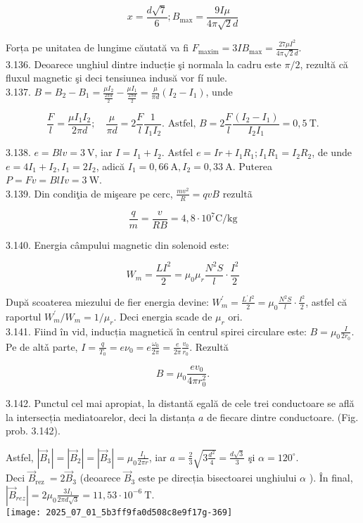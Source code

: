 $$
x=\frac{d \sqrt{7}}{6} ; B_{\max }=\frac{9 I \mu}{4 \pi \sqrt{2} d}
$$

Forța pe unitatea de lungime căutată va fi $F_{\operatorname{maxim}}=3 I B_{\max }=\frac{27 \mu I^{2}}{4 \pi \sqrt{2} d}$.\\
3.136. Deoarece unghiul dintre inducție şi normala la cadru este $\pi / 2$, rezultă că fluxul magnetic şi deci tensiunea indusă vor fí nule.\\
3.137. $B=B_{2}-B_{1}=\frac{\mu I_{2}}{\frac{2 \pi d}{2}}-\frac{\mu I_{1}}{\frac{2 \pi d}{2}}=\frac{\mu}{\pi d}\left(I_{2}-I_{1}\right)$, unde

$$
\frac{F}{l}=\frac{\mu I_{1} I_{2}}{2 \pi d} ; \quad \frac{\mu}{\pi d}=2 \frac{F}{l} \frac{1}{I_{1} I_{2}} . \text { Astfel, } B=2 \frac{F}{l} \frac{\left(I_{2}-I_{1}\right)}{I_{2} I_{1}}=0,5 \mathrm{~T} .
$$

3.138. $e=B l v=3 \mathrm{~V}$, iar $I=I_{1}+I_{2}$. Astfel $e=I r+I_{1} R_{1} ; I_{1} R_{1}=I_{2} R_{2}$, de unde $e=4 I_{1}+I_{2}, I_{1}=2 I_{2}$, adică $I_{1}=0,66 \mathrm{~A}, I_{2}=0,33 \mathrm{~A}$. Puterea $P=F v=B l I v=3 \mathrm{~W}$.\\
3.139. Din condiţia de mişeare pe cerc, $\frac{m v^{2}}{R}=q v B$ rezultã

$$
\frac{q}{m}=\frac{v}{R B}=4,8 \cdot 10^{7} \mathrm{C} / \mathrm{kg}
$$

3.140. Energia câmpului magnetic din solenoid este:

$$
W_{m}=\frac{L I^{2}}{2}=\mu_{0} \mu_{r} \frac{N^{2} S}{l} \cdot \frac{I^{2}}{2}
$$

După scoaterea miezului de fier energia devine: $W_{m}^{\prime}=\frac{L^{\prime} I^{2}}{2}=\mu_{0} \frac{N^{2} S}{l} \cdot \frac{I^{2}}{2}$, astfel că raportul $W_{m}^{\prime} / W_{m}=1 / \mu_{r}$. Deci energia scade de $\mu_{r}$ ori.\\
3.141. Fiind în vid, inducția magnetică în centrul spirei circulare este: $B=\mu_{0} \frac{I}{2 r_{0}}$. Pe de altǎ parte, $I=\frac{q}{T_{0}}=e \nu_{0}=e \frac{\omega_{0}}{2 \pi}=\frac{e}{2 \pi} \frac{v_{0}}{r_{0}}$. Rezultă

$$
B=\mu_{0} \frac{e v_{0}}{4 \pi r_{0}^{2}} .
$$

3.142. Punctul cel mai apropiat, la distantă egală de cele trei conductoare se află la intersecția mediatoarelor, deci la distanța $a$ de fiecare dintre conductoare. (Fig. prob. 3.142).

Astfel, $\left|\vec{B}_{1}\right|=\left|\vec{B}_{2}\right|=\left|\vec{B}_{3}\right|=\mu_{0} \frac{I_{1}}{2 \pi r}$, iar $a=\frac{2}{3} \sqrt{3 \frac{d^{2}}{4}}=\frac{d \sqrt{3}}{3}$ şi $\alpha=120^{\circ}$.\\
Deci $\vec{B}_{\text {rez }}=2 \vec{B}_{3}$ (deoarece $\vec{B}_{3}$ este pe direcția bisectoarei unghiului $\alpha$ ). În final, $\left|\vec{B}_{r e z}\right|=2 \mu_{0} \frac{3 I_{1}}{2 \pi d \sqrt{3}}=11,53 \cdot 10^{-6} \mathrm{~T}$.\\
\texttt{[image: 2025\_07\_01\_5b3ff9fa0d508c8e9f17g-369]}

